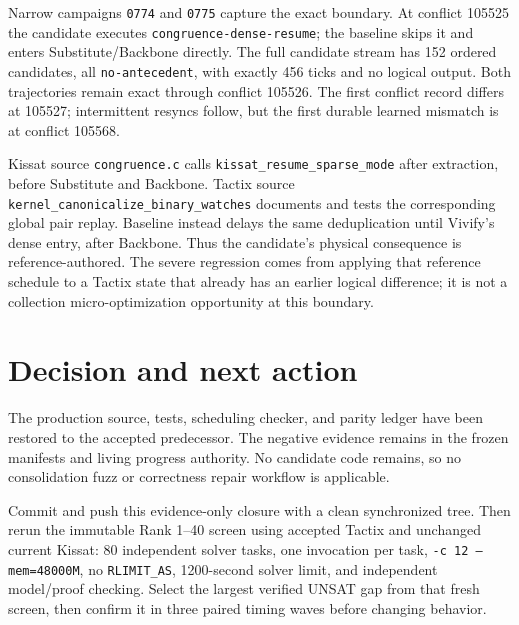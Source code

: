\documentclass[11pt]{article}
\newcommand{\code}[1]{\texttt{#1}}
\begin{document}
Narrow campaigns \code{0774} and \code{0775} capture the exact boundary.  At
conflict 105525 the candidate executes \code{congruence-dense-resume}; the
baseline skips it and enters Substitute/Backbone directly.  The full candidate
stream has 152 ordered candidates, all \code{no-antecedent}, with exactly 456
ticks and no logical output.  Both trajectories remain exact through conflict
105526.  The first conflict record differs at 105527; intermittent resyncs
follow, but the first durable learned mismatch is at conflict 105568.

Kissat source \code{congruence.c} calls
\code{kissat\_resume\_sparse\_mode} after extraction, before Substitute and
Backbone.  Tactix source \code{kernel\_canonicalize\_binary\_watches} documents
and tests the corresponding global pair replay.  Baseline instead delays the
same deduplication until Vivify's dense entry, after Backbone.  Thus the
candidate's physical consequence is reference-authored.  The severe regression
comes from applying that reference schedule to a Tactix state that already has
an earlier logical difference; it is not a collection micro-optimization
opportunity at this boundary.

\section{Decision and next action}

The production source, tests, scheduling checker, and parity ledger have been
restored to the accepted predecessor.  The negative evidence remains in the
frozen manifests and living progress authority.  No candidate code remains,
so no consolidation fuzz or correctness repair workflow is applicable.

Commit and push this evidence-only closure with a clean synchronized tree.
Then rerun the immutable Rank 1--40 screen using accepted Tactix and unchanged
current Kissat: 80 independent solver tasks, one invocation per task,
\code{-c 12 --mem=48000M}, no \code{RLIMIT\_AS}, 1200-second solver limit,
and independent model/proof checking.  Select the largest verified UNSAT gap
from that fresh screen, then confirm it in three paired timing waves before
changing behavior.
\end{document}
